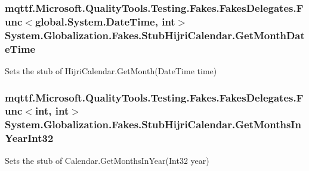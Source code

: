 \hypertarget{class_system_1_1_globalization_1_1_fakes_1_1_stub_hijri_calendar_ad634b84de64e645a0cd396924c9f684e}{
\subsubsection[{Get\-Month\-Date\-Time}]{\setlength{\rightskip}{0pt plus 5cm}mqttf.\-Microsoft.\-Quality\-Tools.\-Testing.\-Fakes.\-Fakes\-Delegates.\-Func$<$global.\-System.\-Date\-Time, int$>$ System.\-Globalization.\-Fakes.\-Stub\-Hijri\-Calendar.\-Get\-Month\-Date\-Time}}\label{class_system_1_1_globalization_1_1_fakes_1_1_stub_hijri_calendar_ad634b84de64e645a0cd396924c9f684e}


Sets the stub of Hijri\-Calendar.\-Get\-Month(\-Date\-Time time)

\hypertarget{class_system_1_1_globalization_1_1_fakes_1_1_stub_hijri_calendar_ac267ff71c6e313f27b47a8b9cf71fe15}{
\subsubsection[{Get\-Months\-In\-Year\-Int32}]{\setlength{\rightskip}{0pt plus 5cm}mqttf.\-Microsoft.\-Quality\-Tools.\-Testing.\-Fakes.\-Fakes\-Delegates.\-Func$<$int, int$>$ System.\-Globalization.\-Fakes.\-Stub\-Hijri\-Calendar.\-Get\-Months\-In\-Year\-Int32}}\label{class_system_1_1_globalization_1_1_fakes_1_1_stub_hijri_calendar_ac267ff71c6e313f27b47a8b9cf71fe15}


Sets the stub of Calendar.\-Get\-Months\-In\-Year(\-Int32 year)

